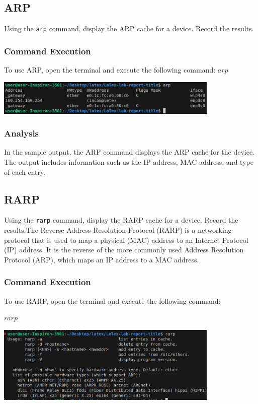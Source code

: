 \documentclass[12pt]{article}
\begin{document}
\subsection{ARP}
Using the {
    \texttt{arp}
} command, display the ARP cache for a device. Record the results.

\subsubsection*{Command Execution}
To use ARP, open the terminal and execute the following command:
$arp$

\includegraphics[width=0.8\textwidth]{arp.png}\par\vspace{1cm}

\subsubsection*{Analysis}
In the sample output, the ARP command displays the ARP cache for the device. The output includes information such as the IP address, MAC address, and type of each entry.

\subsection*{RARP}
Using the {
    \texttt{rarp}
} command, display the RARP cache for a device. Record the results.The Reverse Address Resolution Protocol (RARP) is a networking protocol that is used to map a physical (MAC) address to an Internet Protocol (IP) address. It is the reverse of the more commonly used Address Resolution Protocol (ARP), which maps an IP address to a MAC address.

\subsubsection*{Command Execution}
To use RARP, open the terminal and execute the following command:

$rarp$

\includegraphics[width=0.8\textwidth]{rarp.png}\par\vspace{1cm}
\end{document}
